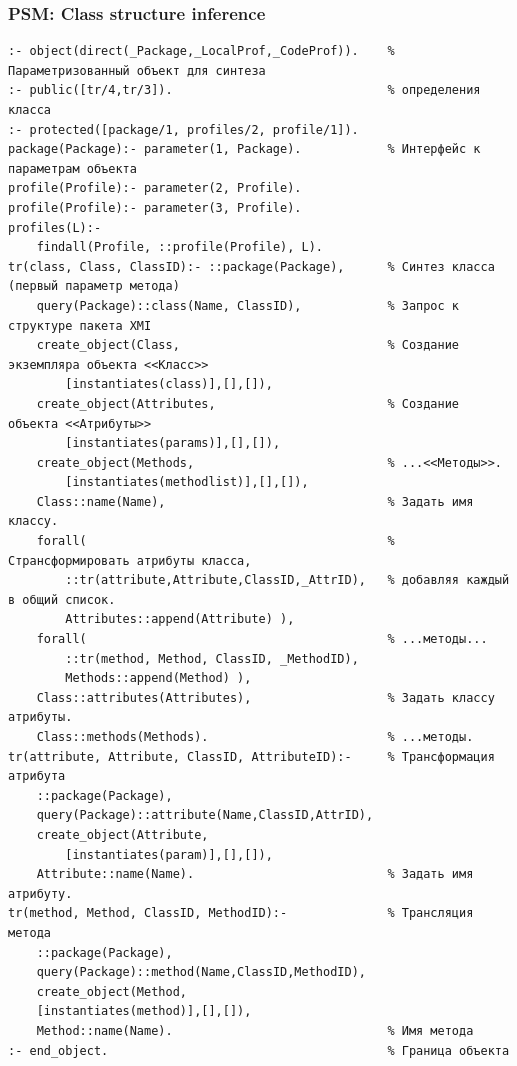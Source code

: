 \documentclass[10pt]{beamer}
\begin{document}
\begin{frame}[fragile]
  \frametitle{PSM: Class structure inference}

\begin{verbatim}
:- object(direct(_Package,_LocalProf,_CodeProf)).    % Параметризованный объект для синтеза
:- public([tr/4,tr/3]).                              % определения класса
:- protected([package/1, profiles/2, profile/1]).
package(Package):- parameter(1, Package).            % Интерфейс к параметрам объекта
profile(Profile):- parameter(2, Profile).
profile(Profile):- parameter(3, Profile).
profiles(L):-
    findall(Profile, ::profile(Profile), L).
tr(class, Class, ClassID):- ::package(Package),      % Синтез класса (первый параметр метода)
    query(Package)::class(Name, ClassID),            % Запрос к структуре пакета XMI
    create_object(Class,                             % Создание экземпляра объекта <<Класс>>
        [instantiates(class)],[],[]),
    create_object(Attributes,                        % Создание объекта <<Атрибуты>>
        [instantiates(params)],[],[]),
    create_object(Methods,                           % ...<<Методы>>.
        [instantiates(methodlist)],[],[]),
    Class::name(Name),                               % Задать имя классу.
    forall(                                          % Странсформировать атрибуты класса,
        ::tr(attribute,Attribute,ClassID,_AttrID),   % добавляя каждый в общий список.
        Attributes::append(Attribute) ),
    forall(                                          % ...методы...
        ::tr(method, Method, ClassID, _MethodID),
        Methods::append(Method) ),
    Class::attributes(Attributes),                   % Задать классу атрибуты.
    Class::methods(Methods).                         % ...методы.
tr(attribute, Attribute, ClassID, AttributeID):-     % Трансформация атрибута
    ::package(Package),
    query(Package)::attribute(Name,ClassID,AttrID),
    create_object(Attribute,
        [instantiates(param)],[],[]),
    Attribute::name(Name).                           % Задать имя атрибуту.
tr(method, Method, ClassID, MethodID):-              % Трансляция метода
    ::package(Package),
    query(Package)::method(Name,ClassID,MethodID),
    create_object(Method,
    [instantiates(method)],[],[]),
    Method::name(Name).                              % Имя метода
:- end_object.                                       % Граница объекта
\end{verbatim}
\end{frame}
\end{document}
